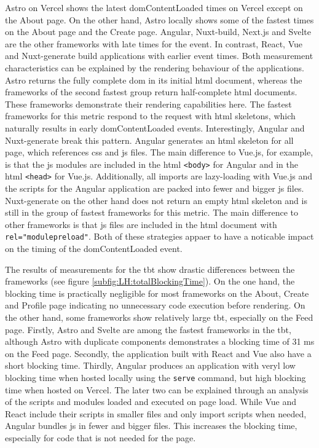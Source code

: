 \documentclass[a4paper, 10pt]{article}
\begin{document}
Astro on Vercel shows the latest domContentLoaded times on Vercel except on the About page.
On the other hand, Astro locally shows some of the fastest times on the About page and the Create page.
Angular, Nuxt-build, Next.js and Svelte are the other frameworks with late times for the event.
In contrast, React, Vue and Nuxt-generate build applications with earlier event times.
Both measurement characteristics can be explained by the rendering behaviour of the applications.
Astro returns the fully complete \acrshort{dom} in its initial \acrshort{html} document, whereas the frameworks of the second fastest group return half-complete \acrshort{html} documents.
These frameworks demonstrate their rendering capabilities here.
The fastest frameworks for this metric respond to the request with \acrshort{html} skeletons, which naturally results in early domContentLoaded events.
Interestingly, Angular and Nuxt-generate break this pattern.
Angular generates an \acrshort{html} skeleton for all page, which references \acrshort{css} and \acrshort{js} files.
The main difference to Vue.js, for example, is that the \acrshort{js} modules are included in the \acrshort{html} \verb|<body>| for Angular and in the \acrshort{html} \verb|<head>| for Vue.js.
Additionally, all imports are lazy-loading with Vue.js and the scripts for the Angular application are packed into fewer and bigger \acrshort{js} files.
Nuxt-generate on the other hand does not return an empty \acrshort{html} skeleton and is still in the group of fastest frameworks for this metric.
The main difference to other frameworks is that \acrshort{js} files are included in the \acrshort{html} document with \verb|rel="modulepreload"|.
Both of these strategies appaer to have a noticable impact on the timing of the domContentLoaded event.

The results of measurements for the \acrlong{tbt} show drastic differences between the frameworks (see figure \ref{subfig:LH:totalBlockingTime}).
On the one hand, the blocking time is practically negligible for most frameworks on the About, Create and Profile page indicating no unnecessary code execution before rendering.
On the other hand, some frameworks show relatively large \acrshort{tbt}, especially on the Feed page.
Firstly, Astro and Svelte are among the fastest frameworks in the \acrshort{tbt}, although Astro with duplicate components demonstrates a blocking time of 31 ms on the Feed page.
Secondly, the application built with React and Vue also have a short blocking time.
Thirdly, Angular produces an application with veryl low blocking time when hosted locally using the \verb|serve| command, but high blocking time when hosted on Vercel.
The later two can be explained through an analysis of the scripts and modules loaded and executed on page load.
While Vue and React include their scripts in smaller files and only import scripts when needed, Angular bundles \acrlong{js} in fewer and bigger files.
This increases the blocking time, especially for code that is not needed for the page.
\end{document}
